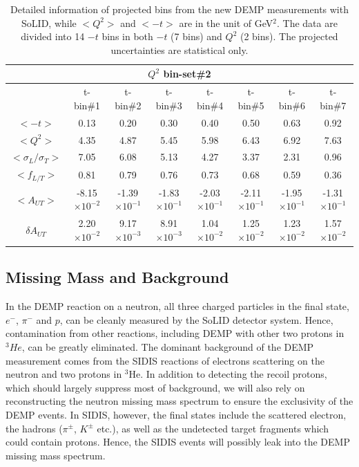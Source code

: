\begin{table}[!ht]
\begin{tabular}{|c|c|c|c|c|c|c|c|}
\multicolumn{8}{|c|}{$Q^{2}$ bin-set\#2 } \\
\hline
      &  t-bin\#1 & t-bin\#2 & t-bin\#3 & t-bin\#4 & t-bin\#5 & t-bin\#6 & t-bin\#7 \\
  \hline
$<-t>$     &  0.13 &  0.20 & 0.30 & 0.40 & 0.50 & 0.63 & 0.92 \\
$<Q^{2}>$   &  4.35 &  4.87 & 5.45 & 5.98 & 6.43 & 6.92 & 7.63 \\
$<\sigma_{L}/\sigma_{T}>$   &  7.05 &  6.08 & 5.13 & 4.27 & 3.37 & 2.31 & 0.96 \\
$<f_{L/T}>$     &  0.81 &  0.79 & 0.76 & 0.73 & 0.68 & 0.59 & 0.36 \\
$<A_{UT}>$   &  -8.15$\times 10^{-2}$ &  -1.39$\times 10^{-1}$ & -1.83$\times 10^{-1}$ & -2.03$\times 10^{-1}$ & -2.11$\times 10^{-1}$ & -1.95$\times 10^{-1}$ & -1.31$\times 10^{-1}$ \\
$\delta A_{UT}$   &  2.20$\times 10^{-2}$ &  9.17$\times 10^{-3}$ & 8.91$\times 10^{-3}$ & 1.04$\times 10^{-2}$ & 1.25$\times 10^{-2}$ & 1.23$\times 10^{-2}$ & 1.57$\times 10^{-2}$ \\
\hline
\end{tabular}
\caption[Detailed information of projected bins]{\footnotesize{Detailed
information of projected bins from the new DEMP measurements with SoLID, while
$<Q^{2}>$ and $<-t>$ are in the unit of GeV$^{2}$. The data are
divided into 14 $-t$ bins in both $-t$ (7 bins) and $Q^{2}$ (2 bins).  The
projected uncertainties are statistical only.}}
\label{asym_bin_table}
\end{table} 

\subsection{Missing Mass and Background}

In the DEMP reaction on a neutron, all three charged particles in the final
state, $e^{-}$, $\pi^{-}$ and $p$, can be cleanly measured by the SoLID detector
system.  Hence, contamination from other reactions, including
DEMP with other two protons in $^{3}He$, can be greatly eliminated.  The
dominant background of the DEMP measurement comes from the SIDIS reactions of
electrons scattering on the neutron and two protons in $\mathrm{^{3}He}$. In
addition to detecting the recoil protons, which should largely suppress most of
background, we will also rely on reconstructing the neutron missing mass
spectrum to ensure the exclusivity of the DEMP events. In SIDIS, however, the
final states include the scattered electron, the hadrons ($\pi^{\pm}$,
$K^{\pm}$ etc.), as well as the undetected target fragments which could contain
protons. Hence, the SIDIS events will possibly leak into the DEMP missing mass
spectrum.

